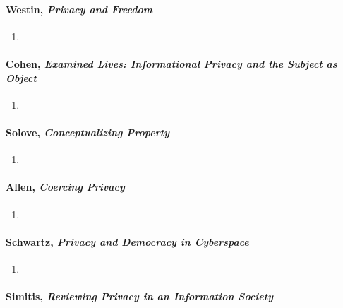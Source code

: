 \paragraph{Westin, \emph{Privacy and Freedom}}

\begin{enumerate}
    \item %
\end{enumerate}

\paragraph{Cohen, \emph{Examined Lives: Informational Privacy and the Subject 
as Object}}

\begin{enumerate}
    \item %
\end{enumerate}

\paragraph{Solove, \emph{Conceptualizing Property}}

\begin{enumerate}
    \item %
\end{enumerate}

\paragraph{Allen, \emph{Coercing Privacy}}

\begin{enumerate}
    \item %
\end{enumerate}

\paragraph{Schwartz, \emph{Privacy and Democracy in Cyberspace}}

\begin{enumerate}
    \item %
\end{enumerate}

\paragraph{Simitis, \emph{Reviewing Privacy in an Information Society}}


